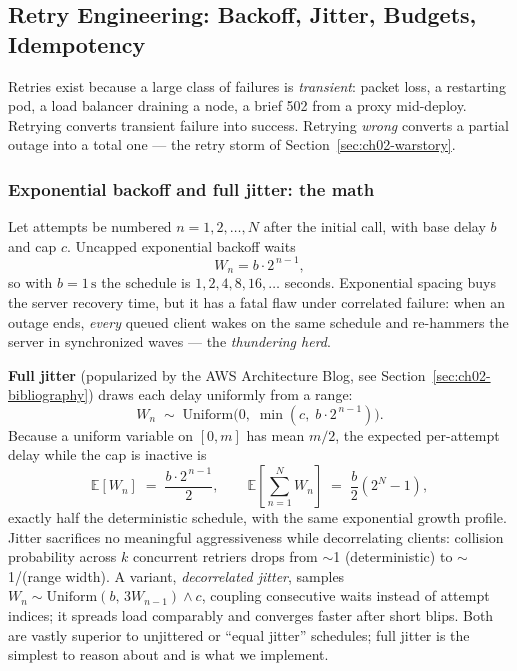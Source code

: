 \subsection{Retry Engineering: Backoff, Jitter, Budgets, Idempotency}
\label{sec:ch02-retries}

Retries exist because a large class of failures is \emph{transient}: packet
loss, a restarting pod, a load balancer draining a node, a brief 502 from a
proxy mid-deploy. Retrying converts transient failure into success. Retrying
\emph{wrong} converts a partial outage into a total one --- the retry storm of
Section~\ref{sec:ch02-warstory}.

\subsubsection{Exponential backoff and full jitter: the math}

Let attempts be numbered $n = 1, 2, \dots, N$ after the initial call, with
base delay $b$ and cap $c$. Uncapped exponential backoff waits
\begin{equation}
  W_n = b \cdot 2^{\,n-1},
\end{equation}
so with $b = 1\,\text{s}$ the schedule is $1, 2, 4, 8, 16, \dots$ seconds.
Exponential spacing buys the server recovery time, but it has a fatal flaw
under correlated failure: when an outage ends, \emph{every} queued client
wakes on the same schedule and re-hammers the server in synchronized waves ---
the \emph{thundering herd}.

\textbf{Full jitter} (popularized by the AWS Architecture Blog, see
Section~\ref{sec:ch02-bibliography}) draws each delay uniformly from a range:
\begin{equation}
  W_n \;\sim\; \mathrm{Uniform}\bigl(0,\; \min(c,\; b \cdot 2^{\,n-1})\bigr).
\end{equation}
Because a uniform variable on $[0, m]$ has mean $m/2$, the expected per-attempt
delay while the cap is inactive is
\begin{equation}
  \mathbb{E}[W_n] \;=\; \frac{b \cdot 2^{\,n-1}}{2},
  \qquad
  \mathbb{E}\!\left[\sum_{n=1}^{N} W_n\right]
  \;=\; \frac{b}{2}\left(2^{N} - 1\right),
  \label{eq:ch02-jitter-total}
\end{equation}
exactly half the deterministic schedule, with the same exponential growth
profile. Jitter sacrifices no meaningful aggressiveness while decorrelating
clients: collision probability across $k$ concurrent retriers drops from
$\sim$1 (deterministic) to $\sim$1/(range width). A variant,
\emph{decorrelated jitter}, samples $W_n \sim \mathrm{Uniform}(b,\,
3 W_{n-1}) \wedge c$, coupling consecutive waits instead of attempt indices;
it spreads load comparably and converges faster after short blips. Both are
vastly superior to unjittered or ``equal jitter'' schedules; full jitter is
the simplest to reason about and is what we implement.

